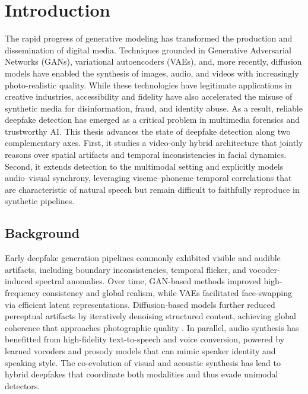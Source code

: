 \chapter{Introduction}

The rapid progress of generative modeling has transformed the production and dissemination of digital media. Techniques grounded in Generative Adversarial Networks (GANs), variational autoencoders (VAEs), and, more recently, diffusion models have enabled the synthesis of images, audio, and videos with increasingly photo-realistic quality. While these technologies have legitimate applications in creative industries, accessibility and fidelity have also accelerated the misuse of synthetic media for disinformation, fraud, and identity abuse. As a result, reliable deepfake detection has emerged as a critical problem in multimedia forensics and trustworthy AI. This thesis advances the state of deepfake detection along two complementary axes. First, it studies a video-only hybrid architecture that jointly reasons over spatial artifacts and temporal inconsistencies in facial dynamics. Second, it extends detection to the multimodal setting and explicitly models audio–visual synchrony, leveraging viseme–phoneme temporal correlations that are characteristic of natural speech but remain difficult to faithfully reproduce in synthetic pipelines.

\section{Background}
Early deepfake generation pipelines commonly exhibited visible and audible artifacts, including boundary inconsistencies, temporal flicker, and vocoder-induced spectral anomalies. Over time, GAN-based methods improved high-frequency consistency and global realism, while VAEs facilitated face-swapping via efficient latent representations. Diffusion-based models further reduced perceptual artifacts by iteratively denoising structured content, achieving global coherence that approaches photographic quality \cite{kaur2024deepfake,rossler2019faceforensics}. In parallel, audio synthesis has benefitted from high-fidelity text-to-speech and voice conversion, powered by learned vocoders and prosody models that can mimic speaker identity and speaking style. The co-evolution of visual and acoustic synthesis has lead to hybrid deepfakes that coordinate both modalities and thus evade unimodal detectors.

